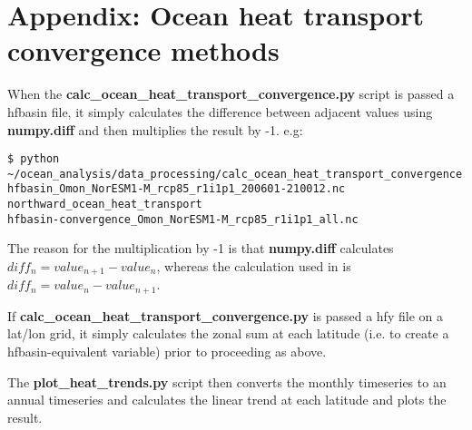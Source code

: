\section{Appendix: Ocean heat transport convergence methods}

When the \textbf{calc_ocean_heat_transport_convergence.py} script is passed a hfbasin file, it simply calculates the difference between adjacent values using \textbf{numpy.diff} and then multiplies the result by -1. e.g:

\begin{verbatim}
$ python ~/ocean_analysis/data_processing/calc_ocean_heat_transport_convergence.py
hfbasin_Omon_NorESM1-M_rcp85_r1i1p1_200601-210012.nc
northward_ocean_heat_transport
hfbasin-convergence_Omon_NorESM1-M_rcp85_r1i1p1_all.nc
\end{verbatim}

The reason for the multiplication by -1 is that \textbf{numpy.diff} calculates $diff_{n} = value_{n+1} - value_{n}$, whereas the calculation used in \citet{Nummelin_2017} is $diff_{n} = value_{n} - value_{n+1}$.    

If \textbf{calc_ocean_heat_transport_convergence.py} is passed a hfy file on a lat/lon grid, it simply calculates the zonal sum at each latitude (i.e. to create a hfbasin-equivalent variable) prior to proceeding as above. 

The \textbf{plot_heat_trends.py} script then converts the monthly timeseries to an annual timeseries and calculates the linear trend at each latitude and plots the result. 
